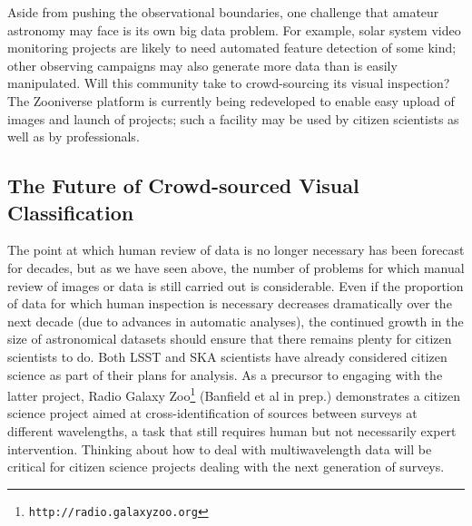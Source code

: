 \documentclass{ar2e}
\def\url#1{\texttt{#1}}
\begin{document}
Aside from pushing the observational boundaries, one challenge that amateur
astronomy may face is its own big data problem.   For example, solar system
video monitoring projects are likely to need automated feature detection of
some kind; other observing campaigns may also generate more data than is
easily manipulated. Will this community take to crowd-sourcing its visual
inspection? The Zooniverse platform is currently being redeveloped to enable
easy upload of images and launch of projects; such a facility may be used by
citizen scientists as well as by  professionals. 



% 

\subsection{The Future of Crowd-sourced Visual Classification}
\label{sec:future_csvis}

The point at which human review of data is no longer necessary has been
forecast for decades, but as we have seen above, the number of problems for
which manual review of images or data is still carried out is considerable.
Even if the proportion of data for which human inspection is necessary
decreases dramatically over the next decade (due to advances in automatic
analyses), the continued growth in the size of astronomical datasets should
ensure that there remains plenty for citizen scientists to do. Both LSST
\citep{LSSTsystem} and SKA scientists \citep{Norris}  have already considered
citizen science as part of their plans for analysis. As a precursor to
engaging with the latter project, Radio Galaxy
Zoo\footnote{\url{http://radio.galaxyzoo.org}} (Banfield et al in prep.)
demonstrates a citizen science project aimed at cross-identification of
sources between surveys at different wavelengths, a task that still requires
human but not necessarily expert intervention. Thinking about how to deal with
multiwavelength data will be critical for citizen science projects dealing
with the next generation of surveys. 
\end{document}
